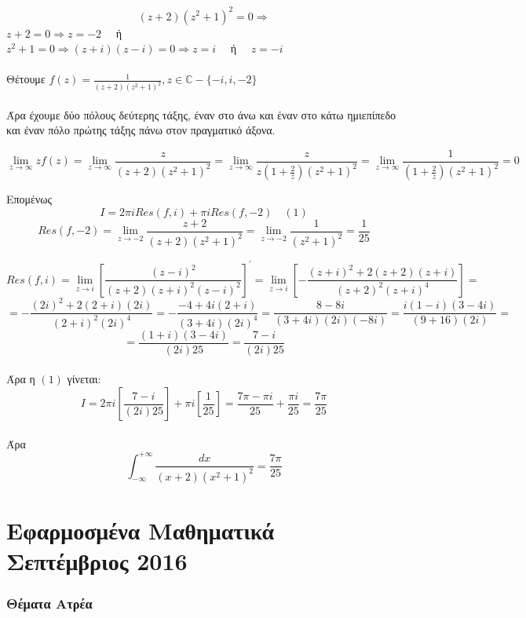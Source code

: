 \documentclass[12pt]{article}
\begin{document}
$$ (z+2)(z^2+1)^2=0 \Rightarrow$$ 
$
z+2=0\Rightarrow z=-2 \quad $ ή $ \quad$ 
\\
$ z^2+1=0\Rightarrow (z+i)(z-i)=0 \Rightarrow z=i \quad$ ή $ \quad z=-i$
\\
\\
Θέτουμε $ f(z)=\frac{1}{(z+2)(z^2+1)^2},z\in\mathbb{C}-\{-i,i,-2\} $
\\  \\
Άρα έχουμε δύο πόλους δεύτερης τάξης, έναν στο άνω και έναν στο κάτω ημιεπίπεδο και έναν πόλο πρώτης τάξης πάνω στον πραγματικό άξονα.

$$ \lim_{z \to \infty } zf(z)=\lim_{z \to \infty } \frac{z}{(z+2)(z^2+1)^2}=
\lim_{z \to \infty } \frac{z}{z\left(1+\frac{2}{z}\right)(z^2+1)^2}=
\lim_{z \to \infty } \frac{1}{\left(1+\frac{2}{z}\right)(z^2+1)^2}=0$$

Επομένως $$ Ι= 2 \pi i Res(f,i)+ \pi i Res(f,-2)\quad (1) $$
$$  Res(f,-2)=\lim_{z\to -2}\frac{z+2}{(z+2)(z^2+1)^2}=\lim_{z\to -2}\frac{1}{(z^2+1)^2}=\frac{1}{25}$$

$$ Res(f,i)=\lim_{z\to i} \left[ \frac{(z-i)^2}{(z+2)(z+i)^2(z-i)^2} \right]^{'}= \lim_{z\to i} \left[-\frac{(z+i)^2+2(z+2)(z+i)}{(z+2)^2(z+i)^4}\right]=$$
$$= -\frac{(2i)^2+2(2+i)(2i)}{(2+i)^2(2i)^4}= -\frac{-4+4i(2+i)}{(3+4i)(2i)^4}= \frac{8-8i}{(3+4i)(2i)(-8i)}=\frac{i(1-i)(3-4i)}{(9+16)(2i)}=$$
$$=\frac{(1+i)(3-4i)}{(2i)25}=\frac{7-i}{(2i)25} $$
\\
Άρα η $(1)$ γίνεται:
\\
$$ Ι=2\pi i \left[ \frac{7-i}{(2i)25} \right] + \pi i \left[ \frac{1}{25} \right] = \frac{ 7\pi -\pi i}{25} + \frac{ \pi i}{25}= \frac{ 7\pi}{25}$$
\\
Άρα $$ \int_{-\infty}^{+\infty} \frac{dx}{(x+2)(x^2+1)^2}=\frac{ 7\pi}{25} $$

 

\newpage 
\part{Εφαρμοσμένα Μαθηματικά Σεπτέμβριος 2016}

  

\maketitle
\newpage
 


 \section{Θέματα Ατρέα}
\end{document}
